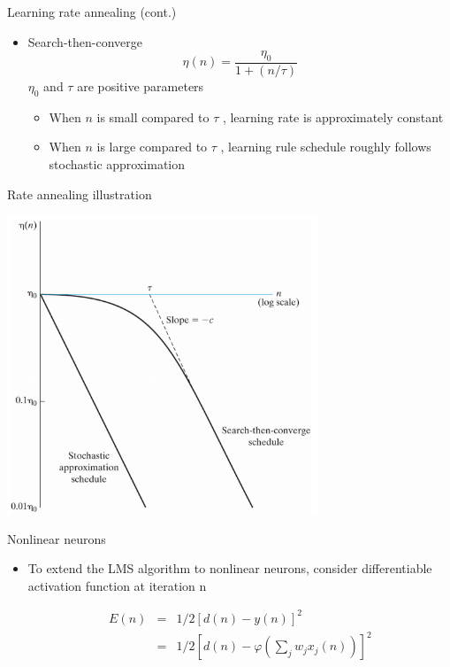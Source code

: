 \documentclass[notes]{beamer}
\providecommand{\tightlist}{%
  \setlength{\itemsep}{0pt}\setlength{\parskip}{0pt}}
\begin{document}
\begin{frame}{Learning rate annealing (cont.)}

\begin{itemize}
\item
  Search-then-converge \[\eta(n) = \frac{\eta_0}{1+(n/\tau)}\]
  \(\eta_0\) and \(\tau\) are positive parameters

  \begin{itemize}
  \tightlist
  \item
    When \(n\) is small compared to \(\tau\) , learning rate is
    approximately constant
  \item
    When \(n\) is large compared to \(\tau\) , learning rule schedule
    roughly follows stochastic approximation
  \end{itemize}
\end{itemize}

\end{frame}

\begin{frame}{Rate annealing illustration}

\centering  

\includegraphics[width=0.70000\textwidth]{2018-03-10-10-18-17.png}\\

\end{frame}

\begin{frame}{Nonlinear neurons}

\begin{itemize}
\tightlist
\item
  To extend the LMS algorithm to nonlinear neurons, consider
  differentiable activation function at iteration n

  \begin{eqnarray*}
         E (n) &=& 1/2 \left[d (n)-  y (n)\right]^2 \\  
              &=& 1/2 \left[ d (n)  - \varphi \left( \sum_{j}  w_j x_j (n) \right) \right] ^2  
  \end{eqnarray*}
\end{itemize}

\end{frame}
\end{document}
